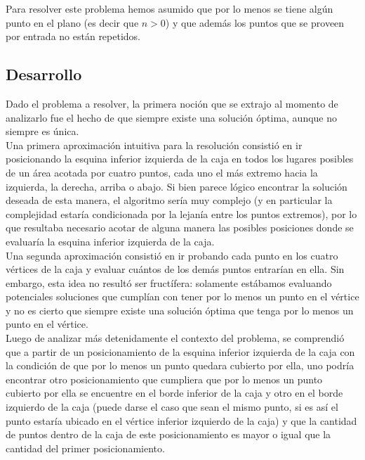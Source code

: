 \indent Para resolver este problema hemos asumido que por lo menos se tiene alg\'un punto en el plano (es decir que $n>0$) y que adem\'as los puntos que se proveen por entrada no est\'an repetidos.\\

\subsection{Desarrollo}


\indent Dado el problema a resolver, la primera noci\'on que se extrajo al momento de analizarlo fue el hecho de que siempre existe una soluci\'on \'optima, aunque no siempre es \'unica.\\
\indent Una primera aproximaci\'on intuitiva para la resoluci\'on consisti\'o en ir posicionando la esquina inferior izquierda de la caja en todos los lugares posibles de un \'area acotada por cuatro puntos, cada uno el m\'as extremo hacia la izquierda, la derecha, arriba o abajo. Si bien parece l\'ogico encontrar la soluci\'on deseada de esta manera, el algoritmo ser\'ia muy complejo (y en particular la complejidad estar\'ia condicionada por la lejan\'ia entre los puntos extremos), por lo que resultaba necesario acotar de alguna manera las posibles posiciones donde se evaluar\'ia la esquina inferior izquierda de la caja.\\
\indent Una segunda aproximaci\'on consisti\'o en ir probando cada punto en los cuatro v\'ertices de la caja y evaluar cu\'antos de los dem\'as puntos entrar\'ian en ella. Sin embargo, esta idea no result\'o ser fruct\'ifera: solamente est\'abamos evaluando potenciales soluciones que cumpl\'ian con tener por lo menos un punto en el v\'ertice y no es cierto que siempre existe una soluci\'on \'optima que tenga por lo menos un punto en el v\'ertice.\\
\indent Luego de analizar m\'as detenidamente el contexto del problema, se comprendi\'o que a partir de un posicionamiento de la esquina inferior izquierda de la caja con la condici\'on de que por lo menos un punto quedara cubierto por ella, uno podr\'ia encontrar otro posicionamiento que cumpliera que por lo menos un punto cubierto por ella se encuentre en el borde inferior de la caja y otro en el borde izquierdo de la caja (puede darse el caso que sean el mismo punto, si es así el punto estar\'ia ubicado en el v\'ertice inferior izquierdo de la caja) y que la cantidad de puntos dentro de la caja de este posicionamiento es mayor o igual que la cantidad del primer posicionamiento.\\
 								
